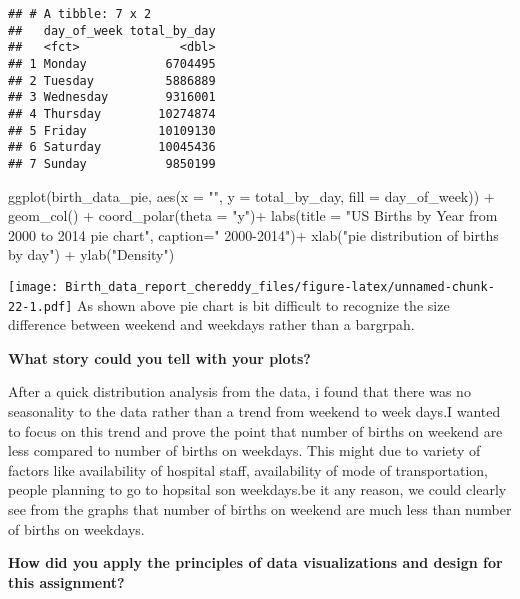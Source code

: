 \documentclass[
]{article}
\newenvironment{Shaded}{\begin{snugshade}}{\end{snugshade}}
\newcommand{\AttributeTok}[1]{\textcolor[rgb]{0.77,0.63,0.00}{#1}}
\newcommand{\FunctionTok}[1]{\textcolor[rgb]{0.00,0.00,0.00}{#1}}
\newcommand{\NormalTok}[1]{#1}
\newcommand{\SpecialCharTok}[1]{\textcolor[rgb]{0.00,0.00,0.00}{#1}}
\newcommand{\StringTok}[1]{\textcolor[rgb]{0.31,0.60,0.02}{#1}}
\begin{document}
\begin{verbatim}
## # A tibble: 7 x 2
##   day_of_week total_by_day
##   <fct>              <dbl>
## 1 Monday           6704495
## 2 Tuesday          5886889
## 3 Wednesday        9316001
## 4 Thursday        10274874
## 5 Friday          10109130
## 6 Saturday        10045436
## 7 Sunday           9850199
\end{verbatim}

\begin{Shaded}
\begin{Highlighting}[]
\FunctionTok{ggplot}\NormalTok{(birth\_data\_pie, }\FunctionTok{aes}\NormalTok{(}\AttributeTok{x =} \StringTok{""}\NormalTok{, }\AttributeTok{y =}\NormalTok{ total\_by\_day, }\AttributeTok{fill =}\NormalTok{ day\_of\_week)) }\SpecialCharTok{+}
  \FunctionTok{geom\_col}\NormalTok{() }\SpecialCharTok{+}
  \FunctionTok{coord\_polar}\NormalTok{(}\AttributeTok{theta =} \StringTok{"y"}\NormalTok{)}\SpecialCharTok{+}
  \FunctionTok{labs}\NormalTok{(}\AttributeTok{title =} \StringTok{"US Births by Year from 2000 to 2014 pie chart"}\NormalTok{,}
       \AttributeTok{caption=}\StringTok{" 2000{-}2014"}\NormalTok{)}\SpecialCharTok{+}
  \FunctionTok{xlab}\NormalTok{(}\StringTok{"pie distribution of births by day"}\NormalTok{) }\SpecialCharTok{+}
  \FunctionTok{ylab}\NormalTok{(}\StringTok{"Density"}\NormalTok{)}
\end{Highlighting}
\end{Shaded}

\texttt{[image: Birth\_data\_report\_chereddy\_files/figure-latex/unnamed-chunk-22-1.pdf]}
As shown above pie chart is bit difficult to recognize the size
difference between weekend and weekdays rather than a bargrpah.

\textbf{What story could you tell with your plots?}

After a quick distribution analysis from the data, i found that there
was no seasonality to the data rather than a trend from weekend to week
days.I wanted to focus on this trend and prove the point that number of
births on weekend are less compared to number of births on weekdays.
This might due to variety of factors like availability of hospital
staff, availability of mode of transportation, people planning to go to
hopsital son weekdays.be it any reason, we could clearly see from the
graphs that number of births on weekend are much less than number of
births on weekdays.

\textbf{How did you apply the principles of data visualizations and
design for this assignment?}
\end{document}
